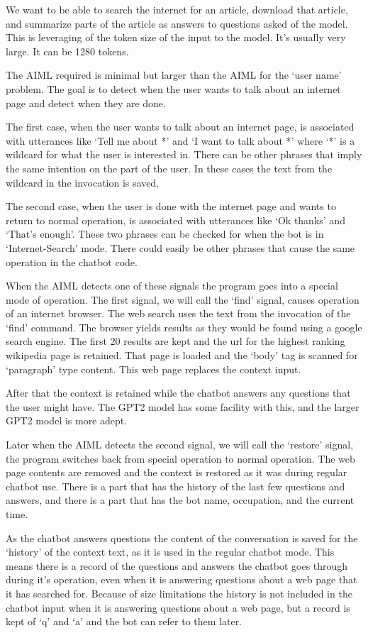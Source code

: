 We want to be able to search the internet for an article, download that article, and summarize parts of the article as answers to questions asked of the model. This is leveraging of the token size of the input to the model. It's usually very large. It can be 1280 tokens.

The AIML required is minimal but larger than the AIML for the `user name' problem. The goal is to detect when the user wants to talk about an internet page and detect when they are done.

The first case, when the user wants to talk about an internet page, is associated with utterances like `Tell me about *' and `I want to talk about *' where `*' is a wildcard for what the user is interested in. There can be other phrases that imply the same intention on the part of the user. In these cases the text from the wildcard in the invocation is saved.

The second case, when the user is done with the internet page and wants to return to normal operation, is associated with utterances like `Ok thanks' and `That's enough'. These two phrases can be checked for when the bot is in `Internet-Search' mode. There could easily be other phrases that cause the same operation in the chatbot code.

When the AIML detects one of these signals the program goes into a special mode of operation. The first signal, we will call the `find' signal, causes operation of an internet browser. The web search uses the text from the invocation of the `find' command. The browser yields results as they would be found using a google search engine. The first 20 results are kept and the url for the highest ranking wikipedia page is retained. That page is loaded and the `body' tag is scanned for `paragraph' type content. This web page replaces the context input. 

After that the context is retained while the chatbot answers any questions that the user might have. The GPT2 model has some facility with this, and the larger GPT2 model is more adept.

Later when the AIML detects the second signal, we will call the `restore' signal, the program switches back from special operation to normal operation. The web page contents are removed and the context is restored as it was during regular chatbot use. There is a part that has the history of the last few questions and answers, and there is a part that has the bot name, occupation, and the current time.

As the chatbot answers questions the content of the conversation is saved for the `history' of the context text, as it is used in the regular chatbot mode. This means there is a record of the questions and answers the chatbot goes through during it's operation, even when it is answering questions about a web page that it has searched for. Because of size limitations the history is not included in the chatbot input when it is answering questions about a web page, but a record is kept of `q' and `a' and the bot can refer to them later.

